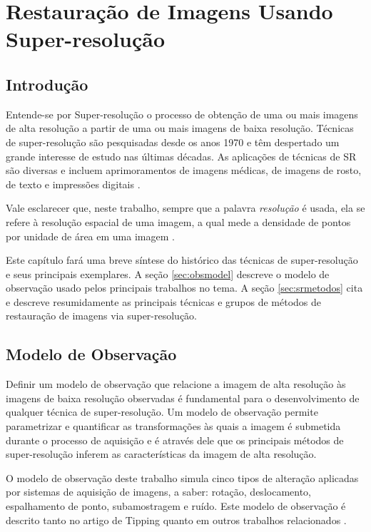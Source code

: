\chapter{Restauração de Imagens Usando Super-resolução}
\section{Introdução}
Entende-se por Super-resolução o processo de obtenção de uma ou mais imagens de alta resolução a partir de uma ou mais imagens de baixa resolução.
Técnicas de super-resolução são pesquisadas desde os anos 1970 e têm despertado um grande interesse de estudo nas últimas décadas.
As aplicações de técnicas de SR são diversas e incluem aprimoramentos de imagens médicas, de imagens de rosto, de texto e impressões digitais \cite{nasrollahi2014super}.

Vale esclarecer que, neste trabalho, sempre que a palavra \textit{resolução} é usada,
ela se refere à resolução espacial de uma imagem, a qual mede a densidade de pontos por
unidade de área em uma imagem \cite{zibetti2007super}.

Este capítulo fará uma breve síntese do histórico das técnicas de super-resolução e seus
principais exemplares.
A seção \ref{sec:obsmodel} descreve o modelo de observação usado pelos principais
trabalhos no tema. A seção \ref{sec:srmetodos} cita e descreve resumidamente as
principais técnicas e grupos de métodos de restauração de imagens via super-resolução. 

\section{\label{sec:obsmodel}Modelo de Observação}


Definir um modelo de observação que relacione a imagem de alta resolução às imagens
de baixa resolução observadas é fundamental para o desenvolvimento de qualquer técnica
de super-resolução. Um modelo de observação permite parametrizar e quantificar as
transformações às quais a imagem é submetida durante o processo de aquisição e é
através dele que os principais métodos de super-resolução inferem as características
da imagem de alta resolução.

O modelo de observação deste trabalho simula cinco tipos de alteração aplicadas por
sistemas de aquisição de imagens, a saber: rotação, deslocamento, espalhamento de
ponto, subamostragem e ruído.
Este modelo de observação é descrito tanto no artigo de Tipping
\cite{tipping2003bayesian} quanto em outros trabalhos relacionados
\cite{pickup2007bayesian, Capel01a}.

